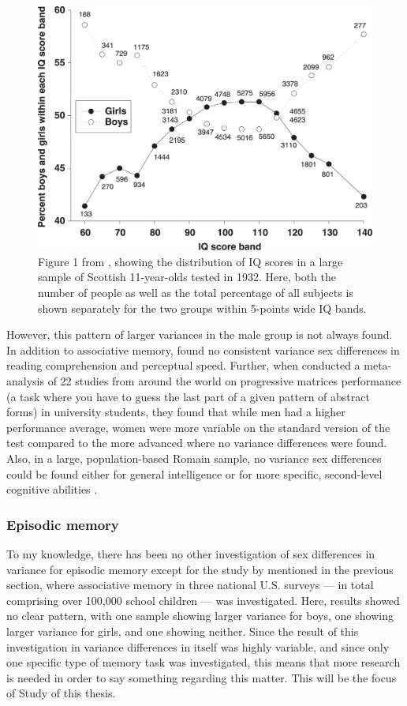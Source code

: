 \begin{figure} \centering \includegraphics[width=120mm]{./Figures/Deary2003.eps} \caption{Figure 1 from \textcite{Deary2003}, showing the distribution of IQ scores in a large sample of Scottish 11-year-olds tested in 1932. Here, both the number of people as well as the total percentage of all subjects is shown separately for the two groups within 5-points wide IQ bands.} \label{Figure:Deary2003} \end{figure}

However, this pattern of larger variances in the male group is not always found. In addition to associative memory, \textcite{Hedges1995} found no consistent variance sex differences in reading comprehension and perceptual speed. Further, when \textcite{Irwing2005} conducted a meta-analysis of 22 studies from around the world on progressive matrices performance (a task where you have to guess the last part of a given pattern of abstract forms) in university students, they found that while men had a higher performance average, women were more variable on the standard version of the test compared to the more advanced where no variance differences were found. Also, in a large, population-based Romain sample, no variance sex differences could be found either for general intelligence or for more specific, second-level cognitive abilities \parencite{Iliescu2016}.

\subsubsection{Episodic memory} \label{Variance_differences_Episodic_memory}

To my knowledge, there has been no other investigation of sex differences in variance for episodic memory except for the study by \textcite{Hedges1995} mentioned in the previous section, where associative memory in three national U.S. surveys --- in total comprising over 100,000 school children ---  was investigated. Here, results showed no clear pattern, with one sample showing larger variance for boys, one showing larger variance for girls, and one showing neither. Since the result of this investigation in variance differences in itself was highly variable, and since only one specific type of memory task was investigated, this means that more research is needed in order to say something regarding this matter. This will be the focus of Study  of this thesis.

